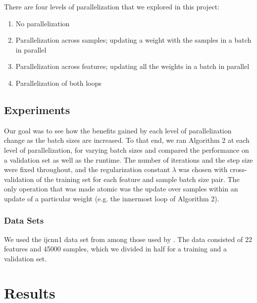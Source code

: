 \documentclass{article}
\begin{document}
There are four levels of parallelization that we explored in this project:
\begin{enumerate}
\item
No parallelization
\item
Parallelization across samples; updating a weight with the samples in a batch in parallel
\item
Parallelization across features; updating all the weights in a batch in parallel
\item
Parallelization of both loops
\end{enumerate}
\subsection{Experiments}
Our goal was to see how the benefits gained by each level of parallelization change as the batch sizes are increased.  To that end, we ran Algorithm 2 at each level of parallelization, for varying batch sizes and compared the performance on a validation set as well as the runtime. The number of iterations and the step size were fixed throughout, and the regularization constant $\lambda$ was chosen with cross-validation of the training set for each feature and sample batch size pair. The only operation that was made atomic was the update over samples within an update of a particular weight (e.g. the innermost loop of Algorithm 2).
\subsubsection{Data Sets}
We used the ijcnn1 data set from among those used by \cite{shotgun2011}. The data consisted of 22 features and 45000  samples, which we divided in half for a training and a validation set.

\section{Results}
\end{document}
